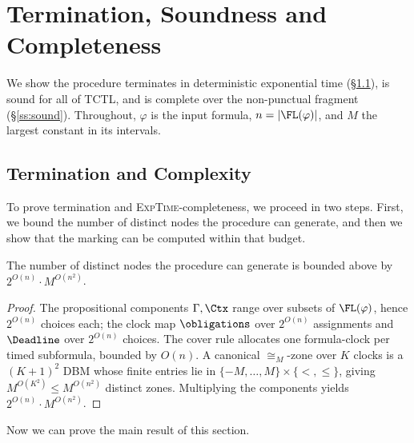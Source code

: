 \section{Termination, Soundness and Completeness}\label{sec:correct}


We show the procedure terminates in deterministic exponential time (\S\ref{ss:term}), is sound
for all of TCTL, and is complete over the non-punctual fragment (\S\ref{ss:sound}). Throughout,
$\varphi$ is the input formula, $n=|\FL(\varphi)|$, and $M$ the largest constant in its
intervals.
\subsection{Termination and Complexity}\label{ss:term}

To prove termination and \textsc{ExpTime}-completeness, we proceed in two steps. First, we bound the number of distinct nodes the procedure can generate, and then we show that the marking can be computed within that budget.

\begin{lemma}\label{lem:finiteness}
The number of distinct nodes the procedure can generate is bounded above by $2^{O(n)}\cdot M^{O(n^2)}$.
\end{lemma}

\begin{proof}
The propositional components $\Gamma,\Ctx$ range over subsets of $\FL(\varphi)$, hence
$2^{O(n)}$ choices each; the clock map $\obligations$ over $2^{O(n)}$ assignments and $\Deadline$ over $2^{O(n)}$ choices. The cover rule allocates one
formula-clock per timed subformula, bounded by $O(n)$. A canonical $\cong_M$-zone over $K$
clocks is a $(K{+}1)^2$ DBM whose finite entries lie in $\{-M,\dots,M\}\times\{<,\le\}$,
giving $M^{O(K^2)}\le M^{O(n^2)}$ distinct zones. Multiplying the components yields $2^{O(n)}\cdot M^{O(n^2)}$.
\end{proof}



Now we can prove the main result of this section.



